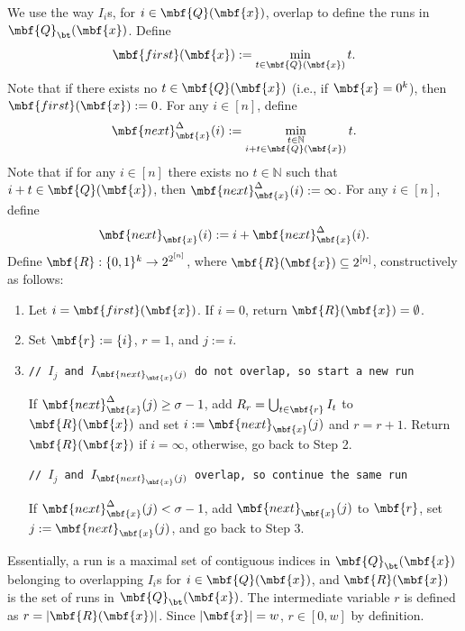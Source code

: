 We use the way $I_i$s, for $i\in\mbf{Q}(\mbf{x})$, overlap to define the runs in $\mbf{Q}_{\bt}(\mbf{x})$. Define$$\mbf{first}(\mbf{x}) := \min_{t \in \mbf{Q}(\mbf{x})}t.$$Note that if there exists no $t \in \mbf{Q}(\mbf{x})$ (i.e., if $\mbf{x} = 0^k$), then $\mbf{first}(\mbf{x}) := 0$. For any $i \in [n]$, define$$\mbf{next}_{\mbf{x}}^{\Delta}(i) := \min_{\substack{t \in \mathbb{N}\\ i+t \in \mbf{Q}(\mbf{x})}}t.$$Note that if for any $i \in [n]$ there exists no $t \in \mathbb{N}$ such that $i+t \in \mbf{Q}(\mbf{x})$, then $\mbf{next}_{\mbf{x}}^{\Delta}(i) := \infty$. For any $i\in[n]$, define$$\mbf{next}_{\mbf{x}}(i) := i+\mbf{next}_{\mbf{x}}^{\Delta}(i).$$Define $\mbf{R}:\{0,1\}^k\rightarrow 2^{2^{[n]}}$, where $\mbf{R}(\mbf{x}) \subseteq 2^{[n]}$, constructively as follows:
\begin{enumerate}
\item Let $i = \mbf{first}(\mbf{x})$. If $i = 0$, return $\mbf{R}(\mbf{x}) = \emptyset$. 
\item Set $\mbf{r} := \{i\}$, $r=1$, and $j := i$. 
\item \texttt{// $I_j$ and $I_{\mbf{next}_{\mbf{x}}(j)}$ do not overlap, so start a new run}

If $\mbf{next}_{\mbf{x}}^{\Delta}(j) \ge \sigma-1$, add $R_r= \bigcup_{t \in \mbf{r}}I_t$ to $\mbf{R}(\mbf{x})$ and set $i := \mbf{next}_{\mbf{x}}(j)$ and $r = r+1$. Return $\mbf{R}(\mbf{x})$ if $i = \infty$, otherwise, go back to Step 2.

\texttt{// $I_j$ and $I_{\mbf{next}_{\mbf{x}}(j)}$ overlap, so continue the same run}

If $\mbf{next}_{\mbf{x}}^{\Delta}(j) < \sigma-1$, add $\mbf{next}_{\mbf{x}}(j)$ to $\mbf{r}$, set $j := \mbf{next}_{\mbf{x}}(j)$, and go back to Step 3.
\end{enumerate}

Essentially, a run is a maximal set of contiguous indices in $\mbf{Q}_{\bt}(\mbf{x})$ belonging to overlapping $I_i$s for $i\in\mbf{Q}(\mbf{x})$, and $\mbf{R}(\mbf{x})$ is the set of runs in $\mbf{Q}_{\bt}(\mbf{x})$. The intermediate variable $r$ is defined as $r = |\mbf{R}(\mbf{x})|$. Since $|\mbf{x}| = w$, $r \in [0,w]$ by definition. %


